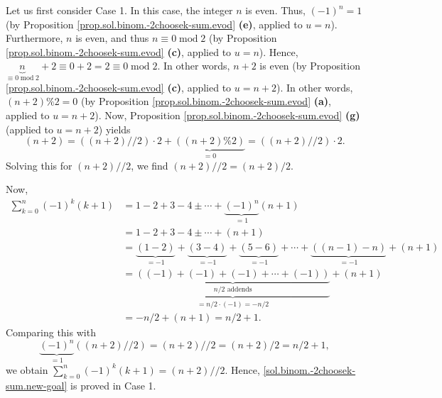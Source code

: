 \documentclass[paper=a4, fontsize=12pt]{scrartcl}%
\let\sumnonlimits\sum
\renewcommand{\sum}{\sumnonlimits\limits}
\theoremstyle{plainsl}
\theoremstyle{definition}
\theoremstyle{remark}
\begin{document}
Let us first consider Case 1. In this case, the integer $n$ is even. Thus,
$\left(  -1\right)  ^{n}=1$ (by Proposition
\ref{prop.sol.binom.-2choosek-sum.evod} \textbf{(e)}, applied to $u=n$).
Furthermore, $n$ is even, and thus $n\equiv0\operatorname{mod}2$ (by
Proposition \ref{prop.sol.binom.-2choosek-sum.evod} \textbf{(c)}, applied to
$u=n$). Hence, $\underbrace{n}_{\equiv0\operatorname{mod}2}+2\equiv
0+2=2\equiv0\operatorname{mod}2$. In other words, $n+2$ is even (by
Proposition \ref{prop.sol.binom.-2choosek-sum.evod} \textbf{(c)}, applied to
$u=n+2$). In other words, $\left(  n+2\right)  \%2=0$ (by Proposition
\ref{prop.sol.binom.-2choosek-sum.evod} \textbf{(a)}, applied to $u=n+2$).
Now, Proposition \ref{prop.sol.binom.-2choosek-sum.evod} \textbf{(g)} (applied
to $u=n+2$) yields
\[
\left(  n+2\right)  =\left(  \left(  n+2\right)  //2\right)  \cdot
2+\underbrace{\left(  \left(  n+2\right)  \%2\right)  }_{=0}=\left(  \left(
n+2\right)  //2\right)  \cdot2.
\]
Solving this for $\left(  n+2\right)  //2$, we find $\left(  n+2\right)
//2=\left(  n+2\right)  /2$.

Now,%
\begin{align*}
\sum_{k=0}^{n}\left(  -1\right)  ^{k}\left(  k+1\right)   &  =1-2+3-4\pm
\cdots+\underbrace{\left(  -1\right)  ^{n}}_{=1}\left(  n+1\right)  \\
&  =1-2+3-4\pm\cdots+\left(  n+1\right)  \\
&  =\underbrace{\left(  1-2\right)  }_{=-1}+\underbrace{\left(  3-4\right)
}_{=-1}+\underbrace{\left(  5-6\right)  }_{=-1}+\cdots+\underbrace{\left(
\left(  n-1\right)  -n\right)  }_{=-1}+\left(  n+1\right)  \\
&  =\underbrace{\underbrace{\left(  \left(  -1\right)  +\left(  -1\right)
+\left(  -1\right)  +\cdots+\left(  -1\right)  \right)  }_{n/2\text{ addends}%
}}_{=n/2\cdot\left(  -1\right)  =-n/2}+\left(  n+1\right)  \\
&  =-n/2+\left(  n+1\right)  =n/2+1.
\end{align*}
Comparing this with%
\[
\underbrace{\left(  -1\right)  ^{n}}_{=1}\left(  \left(  n+2\right)
//2\right)  =\left(  n+2\right)  //2=\left(  n+2\right)  /2=n/2+1,
\]
we obtain $\sum_{k=0}^{n}\left(  -1\right)  ^{k}\left(  k+1\right)  =\left(
n+2\right)  //2$. Hence, \eqref{sol.binom.-2choosek-sum.new-goal} is proved in
Case 1.
\end{document}
